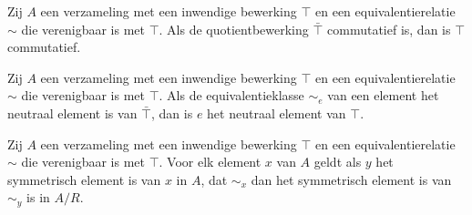 \documentclass[main.tex]{subfiles}
\begin{document}
\begin{st}
    Zij $A$ een verzameling met een inwendige bewerking $\top$ en een equivalentierelatie $\sim$ die verenigbaar is met $\top$.
    Als de quotientbewerking $\bar{\top}$ commutatief is, dan is $\top$ commutatief.
  
\end{st}

\begin{st}
    Zij $A$ een verzameling met een inwendige bewerking $\top$ en een equivalentierelatie $\sim$ die verenigbaar is met $\top$.
    Als de equivalentieklasse $\sim_{e}$ van een element het neutraal element is van $\bar{\top}$, dan is $e$ het neutraal element van $\top$. 
  
\end{st}


\begin{st}
    Zij $A$ een verzameling met een inwendige bewerking $\top$ en een equivalentierelatie $\sim$ die verenigbaar is met $\top$.
    Voor elk element $x$ van $A$ geldt als $y$ het symmetrisch element is van $x$ in $A$, dat $\sim_{x}$ dan het symmetrisch element is van $\sim_{y}$ is in $A/R$.
  
\end{st}
\end{document}
